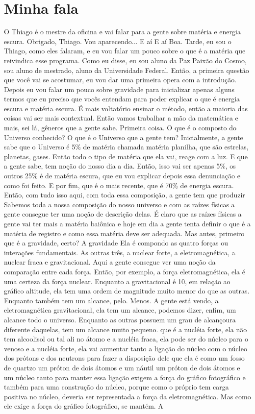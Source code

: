 \documentclass[
	article,			%
	11pt,				%
	twoside,			%
	a4paper,			%
	english,			%
	brazil,				%
	sumario=tradicional
	]{abntex2}
\begin{document}
\chapter{Minha fala}
O Thiago é o mestre da oficina e vai falar para a gente sobre matéria e energia escura. Obrigado, Thiago. Vou aparecendo... E aí E aí Boa. Tarde, eu sou o Thiago, como eles falaram, e eu vou falar um pouco sobre o que é a matéria que reivindica esse programa. Como eu disse, eu sou aluno da Paz Paixão do Cosmo, sou aluno de mestrado, aluno da Universidade Federal. Então, a primeira questão que você vai se acostumar, eu vou dar uma primeira opera com a introdução. Depois eu vou falar um pouco sobre gravidade para inicializar apenas alguns termos que eu preciso que vocês entendam para poder explicar o que é energia escura e matéria escura. É mais voltatório ensinar o método, então a maioria das coisas vai ser mais contextual. Então vamos trabalhar a mão da matemática e mais, sei lá, gêneros que a gente sabe. Primeira coisa. O que é o composto do Universo conhecido? O que é o Universo que a gente tem? Inicialmente, a gente sabe que o Universo é 5\% de matéria chamada matéria planilha, que são estrelas, planetas, gases. Então todo o tipo de matéria que ela vai, reage com a luz. E que a gente sabe, tem noção do nosso dia a dia. Então, isso vai ser apenas 5\%, os outros 25\% é de matéria escura, que eu vou explicar depois essa denunciação e como foi feito. E por fim, que é o mais recente, que é 70\% de energia escura. Então, com tudo isso aqui, com toda essa composição, a gente tem que produzir Sabemos toda a nossa composição do nosso universo e com as raízes físicas a gente consegue ter uma noção de descrição delas. É claro que as raízes físicas a gente vai ter mais a matéria baiônica e hoje em dia a gente tenta definir o que é a matéria de registro e como essa matéria deve ser adequada. Mas antes, primeiro que é a gravidade, certo? A gravidade Ela é compondo as quatro forças ou interações fundamentais. As outras três, a nuclear forte, a eletromagnética, a nuclear fraca e gravitacional. Aqui a gente consegue ver uma noção da comparação entre cada força. Então, por exemplo, a força eletromagnética, ela é uma certeza da força nuclear. Enquanto a gravitacional é 10, em relação ao gráfico altitude, ela tem uma ordem de magnitude muito menor do que as outras. Enquanto também tem um alcance, pelo. Menos. A gente está vendo, a eletromagnética gravitacional, ela tem um alcance, podemos dizer, enfim, um alcance todo o universo. Enquanto as outras possuem um grau de alcançoura diferente daquelas, tem um alcance muito pequeno. que é a nucléia forte, ela não tem alcoolisol ou tal ali no átomo e a nucléia fraca, ela pode ser do núcleo para o venoso e a nucléia forte, ela vai aumentar tanto a ligação do núcleo com o núcleo dos prótons e dos neutrons para fazer a disposição dele que ela é como um fosso de quartzo um próton de dois átomos e um náutil um próton de dois átomos e um núcleo tanto para manter essa ligação exigem a força do gráfico fotográfico e também para uma construção do núcleo, porque como o próprio tem carga positiva no núcleo, deveria ser representada a força da eletromagnética. Mas como ele exige a força do gráfico fotográfico, se mantém. A 
\end{document}
